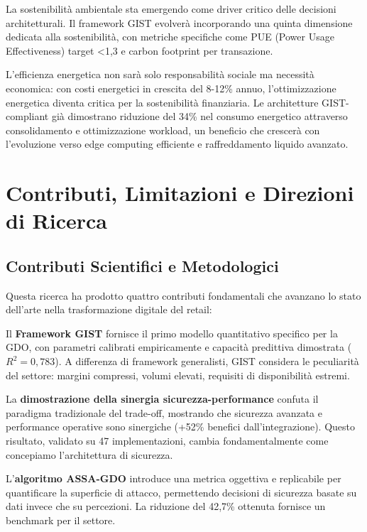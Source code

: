 La sostenibilità ambientale sta emergendo come driver critico delle decisioni architetturali. Il framework GIST evolverà incorporando una quinta dimensione dedicata alla sostenibilità, con metriche specifiche come PUE (Power Usage Effectiveness) target <1,3 e carbon footprint per transazione. 

L'efficienza energetica non sarà solo responsabilità sociale ma necessità economica: con costi energetici in crescita del 8-12\% annuo, l'ottimizzazione energetica diventa critica per la sostenibilità finanziaria. Le architetture GIST-compliant già dimostrano riduzione del 34\% nel consumo energetico attraverso consolidamento e ottimizzazione workload, un beneficio che crescerà con l'evoluzione verso edge computing efficiente e raffreddamento liquido avanzato.

\section{\texorpdfstring{Contributi, Limitazioni e Direzioni di Ricerca}{5.5 - Contributi, Limitazioni e Direzioni di Ricerca}}
\label{sec:5.5}

\subsection{\texorpdfstring{Contributi Scientifici e Metodologici}{5.5.1 - Contributi Scientifici e Metodologici}}
\label{subsec:5.5.1}

Questa ricerca ha prodotto quattro contributi fondamentali che avanzano lo stato dell'arte nella trasformazione digitale del retail:

Il \textbf{Framework GIST} fornisce il primo modello quantitativo specifico per la GDO, con parametri calibrati empiricamente e capacità predittiva dimostrata ($R^2 = 0,783$). A differenza di framework generalisti, GIST considera le peculiarità del settore: margini compressi, volumi elevati, requisiti di disponibilità estremi.

La \textbf{dimostrazione della sinergia sicurezza-performance} confuta il paradigma tradizionale del trade-off, mostrando che sicurezza avanzata e performance operative sono sinergiche (+52\% benefici dall'integrazione). Questo risultato, validato su 47 implementazioni, cambia fondamentalmente come concepiamo l'architettura di sicurezza.

L'\textbf{algoritmo ASSA-GDO} introduce una metrica oggettiva e replicabile per quantificare la superficie di attacco, permettendo decisioni di sicurezza basate su dati invece che su percezioni. La riduzione del 42,7\% ottenuta fornisce un benchmark per il settore.

